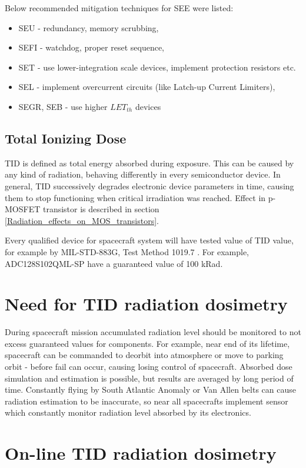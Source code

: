         Below recommended mitigation techniques for SEE were listed:
        \begin{itemize}
            \item SEU - redundancy, memory scrubbing,
            \item SEFI - watchdog, proper reset sequence,
            \item SET - use lower-integration scale devices, implement protection resistors etc.
            \item SEL - implement overcurrent circuits (like Latch-up Current Limiters),
            \item SEGR, SEB - use higher $LET_{th}$ devices
        \end{itemize}

    \subsection{Total Ionizing Dose}
        TID is defined as total energy absorbed during exposure. This can be caused by any kind of radiation, behaving differently in every semiconductor device. In general, TID successively degrades electronic device parameters in time, causing them to stop functioning when critical irradiation was reached. Effect in p-MOSFET transistor is described in section \ref{Radiation_effects_on_MOS_transistors}.

        Every qualified device for spacecraft system will have tested value of TID value, for example by MIL-STD-883G, Test Method 1019.7 \cite{MIL_STD_883}. For example, ADC128S102QML-SP have a guaranteed value of 100 kRad.

\section{Need for TID radiation dosimetry}
    During spacecraft mission accumulated radiation level should be monitored to not excess guaranteed values for components. For example, near end of its lifetime, spacecraft can be commanded to deorbit into atmosphere or move to parking orbit - before fail can occur, causing losing control of spacecraft.
    Absorbed dose simulation and estimation is possible, but results are averaged by long period of time. Constantly flying by South Atlantic Anomaly or Van Allen belts can cause radiation estimation to be inaccurate, so near all spacecrafts implement sensor which constantly monitor radiation level absorbed by its electronics.

\section{On-line TID radiation dosimetry}

